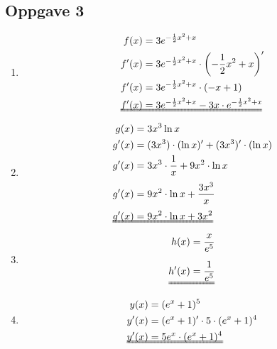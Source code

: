 \documentclass[11pt,a4paper]{report}
\newcommand{\m}{\cdot}
\newcommand{\opgd}[1]{\item[#1)]}
\newcommand{\opg}[1]{\subsection*{Oppgave #1}}
\newcommand{\svaralign}[2]{\makebox[0pt][l]{\uuline{\phantom{$#1 #2$}}}#1 &#2}
\begin{document}
\opg{3}
\begin{enumerate}[leftmargin=*,itemsep=1cm,labelsep=2em,label=\alph*)]
\opgd{a}
\begin{align*}
f(x) &= 3e^{-\frac{1}{2}x^2+x}\\
f'(x) &= 3e^{-\frac{1}{2}x^2+x} \m \left( -\frac{1}{2}x^2+x \right)'\\
f'(x) &= 3e^{-\frac{1}{2}x^2+x} \m (-x + 1)\\
\svaralign{f'(x)}{= 3e^{-\frac{1}{2}x^2+x} - 3x \m e^{-\frac{1}{2}x^2+x}}
\end{align*}

\opgd{b}
\begin{align*}
g(x) &= 3x^3 \ln x\\
g'(x) &= (3x^3) \m (\ln x)' + (3x^3)' \m (\ln x)\\
g'(x) &= 3x^3 \m \frac{1}{x} + 9x^2 \m \ln x\\[0.1 cm]
g'(x) &= 9x^2 \m \ln x + \frac{3x^3}{x}\\[0.1 cm]
\svaralign{g'(x)}{= 9x^2 \m \ln x + 3x^2}
\end{align*}

\opgd{c}
\begin{align*}
h(x) = \frac{x}{e^5}\\[0.2 cm]
\uuline{h'(x) = \frac{1}{e^5}}
\end{align*}

\opgd{d}
\begin{align*}
y(x) &= (e^x + 1)^5\\
y'(x) &= (e^x + 1)' \m 5 \m (e^x + 1)^4\\
\svaralign{y'(x)}{= 5e^x \m (e^x + 1)^4}
\end{align*}
\end{enumerate}

\newpage

\end{document}
